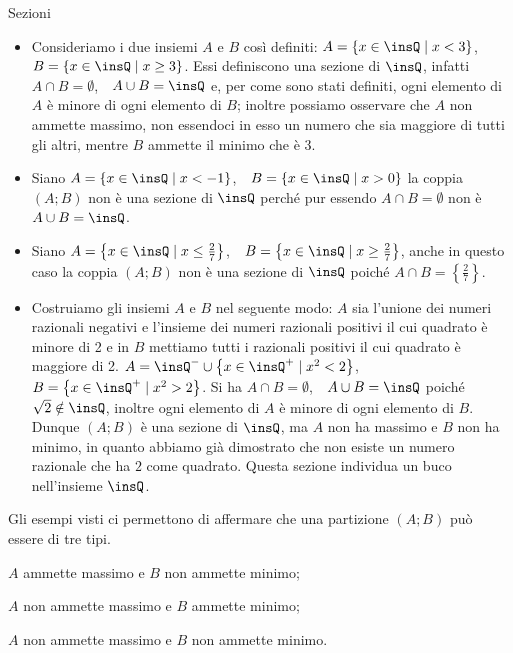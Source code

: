 \begin{exrig}
 \begin{esempio}
 Sezioni
 \begin{itemize}
 \item Consideriamo i due insiemi $A$ e $B$ così definiti: $A=\left\{x\in \insQ \mid x<3\right\}$,\ \ 
$B=\left\{x\in \insQ \mid x \ge 3\right\}$. Essi definiscono una sezione di $\insQ$, infatti
$A \cap B=\emptyset$,~~$A \cup B=\insQ$ e, per come sono stati definiti, ogni elemento di $A$ è minore di ogni elemento di $B$; inoltre possiamo osservare che $A$ non ammette massimo, non essendoci in esso un numero che sia maggiore di tutti gli altri, mentre $B$ ammette il minimo che è 3.
 \item Siano $A=\left\{x\in \insQ \mid x<-1\right\}$,~~$B=\left\{x \in \insQ \mid x>0\right\}$ la coppia $(A;B)$ non è una sezione di $\insQ$ perché pur essendo $A\cap B=\emptyset$ non è $A\cup B=\insQ$.
 \item Siano $A=\left\{x\in \insQ \mid x \le \frac{2}{7}\right\}$,~~$B=\left\{x \in \insQ \mid x \ge \frac{2}{7}\right\}$, anche in questo caso la coppia $(A;B)$ non è una sezione di $\insQ$ poiché $A\cap B=\left\{\frac{2}{7}\right\}$.
 \item Costruiamo gli insiemi $A$ e $B$ nel seguente modo: $A$ sia l'unione dei numeri razionali negativi e l'insieme dei numeri razionali positivi il cui quadrato è minore di 2 e in $B$ mettiamo tutti i razionali positivi il cui quadrato è maggiore di 2. $A=\insQ^{-} \cup \left\{x \in \insQ^{+} \mid x^{2}<2\right\}$, $B=\left\{x \in \insQ^{+} \mid x^{2}>2\right\}$. Si ha $A \cap B=\emptyset$,~~$A\cup B=\insQ$ poiché $\sqrt{2}\notin\insQ$, inoltre ogni elemento di $A$ è minore di ogni elemento di $B$. Dunque $(A;B)$ è una sezione di $\insQ$, ma $A$ non ha massimo e $B$ non ha minimo, in quanto abbiamo già dimostrato che non esiste un numero razionale che ha $2$ come quadrato. Questa sezione individua un buco nell'insieme $\insQ$.
 \end{itemize}
 \end{esempio}
\end{exrig}

Gli esempi visti ci permettono di affermare che una partizione $(A;B)$ può essere di tre tipi.
\begin{itemize*}
\item $A$ ammette massimo e $B$ non ammette minimo;
\item $A$ non ammette massimo e $B$ ammette minimo;
\item $A$ non ammette massimo e $B$ non ammette minimo.
\end{itemize*}

